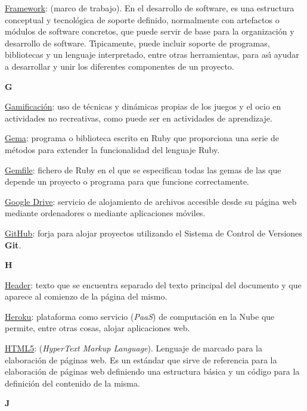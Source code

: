 \underline{Framework}: (marco de trabajo). En el desarrollo de software, es una estructura conceptual y tecnol\'ogica de soporte definido, normalmente con artefactos o 
m\'odulos de software concretos, que puede servir de base para la organizaci\'on y desarrollo de software. T\'{\i}picamente, puede incluir soporte de programas, bibliotecas y 
un lenguaje interpretado, entre otras herramientas, para as\'{\i} ayudar a desarrollar y unir los diferentes componentes de un proyecto.
\bigskip

\bigskip
{\bfseries {\Huge G}}\label{Apendice1:G}
\bigskip
\bigskip

\underline{Gamificaci\'on}: uso de t\'ecnicas y din\'amicas propias de los juegos y el ocio en actividades no recreativas, como puede ser en actividades de aprendizaje.
\bigskip

\underline{Gema}: programa o biblioteca escrito en Ruby que proporciona una serie de m\'etodos para extender la funcionalidad del lenguaje Ruby.
\bigskip

\underline{Gemfile}: fichero de Ruby en el que se especifican todas las gemas de las que depende un proyecto o programa para que funcione correctamente.
\bigskip

\href{https://drive.google.com}{\underline{Google Drive}}: servicio de alojamiento de archivos accesible desde su p\'agina web mediante ordenadores o mediante aplicaciones m\'oviles.
\bigskip

\href{https://github.com}{\underline{GitHub}}: forja para alojar proyectos utilizando el Sistema de Control de Versiones {\bfseries Git}. 
\bigskip

\bigskip
{\bfseries {\Huge H}}\label{Apendice1:H}
\bigskip
\bigskip

\underline{Header}: texto que se encuentra separado del texto principal del documento y que aparece al comienzo de la p\'agina del mismo.
\bigskip

\href{https://www.heroku.com/}{\underline{Heroku}}: plataforma como servicio (\textit{PaaS}) de computaci\'on en la Nube que permite, entre otras cosas, alojar aplicaciones web.
\bigskip

\underline{HTML5}: (\textit{HyperText Markup Language}). Lenguaje de marcado para la elaboraci\'on de p\'aginas web. Es un est\'andar que sirve de referencia para la elaboraci\'on 
de p\'aginas web definiendo una estructura b\'asica y un c\'odigo para la definici\'on del contenido de la misma.
\bigskip

\bigskip
{\bfseries {\Huge J}}\label{Apendice1:J}
\bigskip
\bigskip

